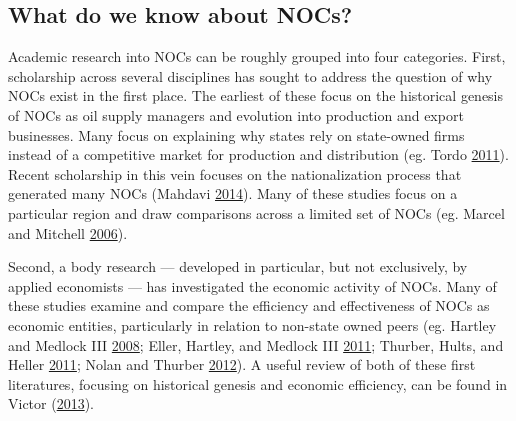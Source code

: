 \documentclass[11pt,]{book}
\begin{document}
\hypertarget{what-do-we-know-about-nocs}{%
\subsection{What do we know about NOCs?}\label{what-do-we-know-about-nocs}}

Academic research into NOCs can be roughly grouped into four categories. First, scholarship across several disciplines has sought to address the question of why NOCs exist in the first place. The earliest of these focus on the historical genesis of NOCs as oil supply managers and evolution into production and export businesses. Many focus on explaining why states rely on state-owned firms instead of a competitive market for production and distribution (eg. Tordo \protect\hyperlink{ref-tordo_national_2011}{2011}). Recent scholarship in this vein focuses on the nationalization process that generated many NOCs (Mahdavi \protect\hyperlink{ref-mahdavi_why_2014}{2014}). Many of these studies focus on a particular region and draw comparisons across a limited set of NOCs (eg. Marcel and Mitchell \protect\hyperlink{ref-marcel_oil_2006}{2006}).

Second, a body research --- developed in particular, but not exclusively, by applied economists --- has investigated the economic activity of NOCs. Many of these studies examine and compare the efficiency and effectiveness of NOCs as economic entities, particularly in relation to non-state owned peers (eg. Hartley and Medlock III \protect\hyperlink{ref-hartley_model_2008}{2008}; Eller, Hartley, and Medlock III \protect\hyperlink{ref-eller_empirical_2011}{2011}; Thurber, Hults, and Heller \protect\hyperlink{ref-thurber_exporting_2011}{2011}; Nolan and Thurber \protect\hyperlink{ref-victor_states_2012}{2012}). A useful review of both of these first literatures, focusing on historical genesis and economic efficiency, can be found in Victor (\protect\hyperlink{ref-victor_national_2013}{2013}).
\end{document}
